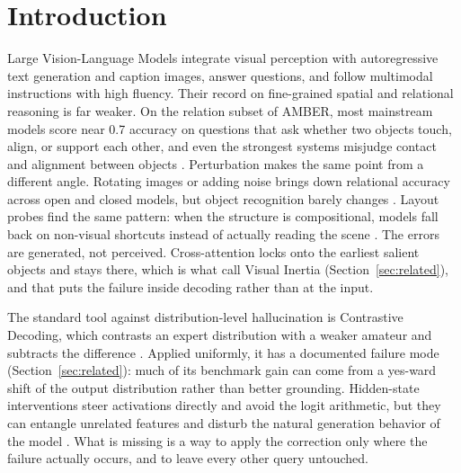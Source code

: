 \documentclass[pdflatex,sn-basic,Numbered]{sn-jnl}
\theoremstyle{thmstyleone}
\theoremstyle{thmstyletwo}
\theoremstyle{thmstylethree}
\begin{document}

\maketitle

\section{Introduction}\label{sec:intro}

Large Vision-Language Models integrate visual perception with autoregressive text generation \cite{liu2023visual} and caption images, answer questions, and follow multimodal instructions with high fluency. Their record on fine-grained spatial and relational reasoning is far weaker. On the relation subset of AMBER, most mainstream models score near 0.7 accuracy on questions that ask whether two objects touch, align, or support each other, and even the strongest systems misjudge contact and alignment between objects \cite{wang2023amber}. Perturbation makes the same point from a different angle. Rotating images or adding noise brings down relational accuracy across open and closed models, but object recognition barely changes \cite{shin2026when}. Layout probes find the same pattern: when the structure is compositional, models fall back on non-visual shortcuts instead of actually reading the scene \cite{brown2025hallucination,chen2024spatialvlm}. The errors are generated, not perceived. Cross-attention locks onto the earliest salient objects and stays there, which is what \cite{gong2026attention} call Visual Inertia (Section~\ref{sec:related}), and that puts the failure inside decoding rather than at the input.

The standard tool against distribution-level hallucination is Contrastive Decoding, which contrasts an expert distribution with a weaker amateur and subtracts the difference \cite{leng2024mitigating}. Applied uniformly, it has a documented failure mode (Section~\ref{sec:related}): much of its benchmark gain can come from a yes-ward shift of the output distribution rather than better grounding. Hidden-state interventions steer activations directly and avoid the logit arithmetic, but they can entangle unrelated features and disturb the natural generation behavior of the model \cite{su2025activation,zhang2026mitigating}. What is missing is a way to apply the correction only where the failure actually occurs, and to leave every other query untouched.
\end{document}
